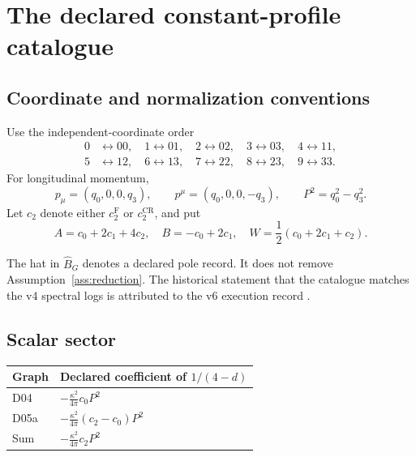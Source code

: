 \documentclass[11pt,a4paper]{article}
\newcommand{\ka}{\kappa}
\newcommand{\Fr}{\mathrm F}
\newcommand{\CR}{\mathrm{CR}}
\theoremstyle{plain}
\theoremstyle{definition}
\theoremstyle{remark}
\numberwithin{equation}{section}
\begin{document}
\section{The declared constant-profile catalogue}
\label{sec:catalogue}

\subsection{Coordinate and normalization conventions}

Use the independent-coordinate order
\[
\begin{split}
0&\leftrightarrow00,\quad
1\leftrightarrow01,\quad
2\leftrightarrow02,\quad
3\leftrightarrow03,\quad
4\leftrightarrow11,\\
5&\leftrightarrow12,\quad
6\leftrightarrow13,\quad
7\leftrightarrow22,\quad
8\leftrightarrow23,\quad
9\leftrightarrow33.
\end{split}
\]
For longitudinal momentum,
\[
 p_\mu=(q_0,0,0,q_3),\qquad
 p^\mu=(q_0,0,0,-q_3),\qquad
 P^2=q_0^2-q_3^2.
\]
Let \(c_2\) denote either \(c_2^\Fr\) or \(c_2^\CR\), and put
\begin{equation}
 A=c_0+2c_1+4c_2,\quad B=-c_0+2c_1,\quad
 W=\frac12(c_0+2c_1+c_2).
 \label{eq:ABW}
\end{equation}

The hat in \(\widehat B_G\) denotes a declared pole record.
It does not remove Assumption~\ref{ass:reduction}.
The historical statement that the catalogue matches the v4
spectral logs is attributed to the v6 execution record
\cite{CheungConeV6}.

\subsection{Scalar sector}

\begin{center}
\begin{tabular}{@{}ll@{}}
\toprule
Graph & Declared coefficient of \(1/(4-d)\)\\
\midrule
D04 & \(\displaystyle-\frac{\ka^2}{4\pi}c_0P^2\)\\[4pt]
D05a & \(\displaystyle-\frac{\ka^2}{4\pi}(c_2-c_0)P^2\)\\[4pt]
Sum & \(\displaystyle-\frac{\ka^2}{4\pi}c_2P^2\)\\
\bottomrule
\end{tabular}
\end{center}
\end{document}
